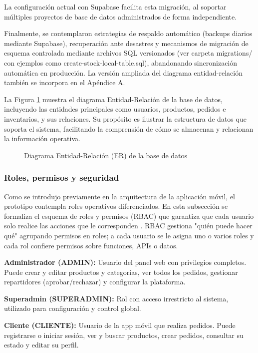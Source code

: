   La configuración actual con Supabase facilita esta migración, al soportar múltiples proyectos de base de datos administrados de forma independiente.

  Finalmente, se contemplaron estrategias de respaldo automático (backups diarios mediante Supabase), recuperación ante desastres y mecanismos de migración de esquema controlada mediante archivos SQL versionados (ver carpeta migrations/ con ejemplos como create-stock-local-table.sql), abandonando sincronización automática en producción.
  La versión ampliada del diagrama entidad-relación también se incorpora en el Apéndice A.

  La Figura \ref{fig:diagrama-bd} muestra el diagrama Entidad-Relación de la base de datos, incluyendo las entidades principales como usuarios, productos, pedidos e inventarios, y sus relaciones. Su propósito es ilustrar la estructura de datos que soporta el sistema, facilitando la comprensión de cómo se almacenan y relacionan la información operativa.

  \begin{figure}[htbp]
  \centering
  \resizebox{0.90\textwidth}{!}{}
  \caption[Diagrama ER]{Diagrama Entidad-Relación (ER) de la base de datos}
  \label{fig:diagrama-bd}
  \end{figure}

  \subsubsection*{Roles, permisos y seguridad}
  Como se introdujo previamente en la arquitectura de la aplicación móvil, el prototipo contempla roles operativos diferenciados. En esta subsección se formaliza el esquema de roles y permisos (RBAC) que garantiza que cada usuario solo realice las acciones que le corresponden \parencite{Logto_RBAC}. RBAC gestiona "quién puede hacer qué" agrupando permisos en roles; a cada usuario se le asigna uno o varios roles y cada rol confiere permisos sobre funciones, APIs o datos.

  \textbf{Administrador (ADMIN):} Usuario del panel web con privilegios completos. Puede crear y editar productos y categorías, ver todos los pedidos, gestionar repartidores (aprobar/rechazar) y configurar la plataforma.
  
  \textbf{Superadmin (SUPERADMIN):} Rol con acceso irrestricto al sistema, utilizado para configuración y control global.

  \textbf{Cliente (CLIENTE):} Usuario de la app móvil que realiza pedidos. Puede registrarse o iniciar sesión, ver y buscar productos, crear pedidos, consultar su estado y editar su perfil.

